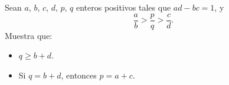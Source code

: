 Sean $a$, $b$, $c$, $d$, $p$, $q$ enteros positivos tales que $ad-bc=1$, y 
\[\frac ab \gt \frac pq \gt \frac cd.\]
Muestra que:
 \begin{itemize} 
 \item  $q\geq b+d$.
 \item  Si $q=b+d$, entonces $p=a+c$.
 \end{itemize} 